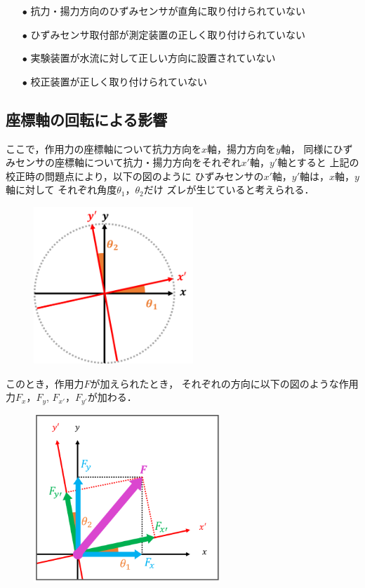 \documentclass[twocolumn,a4j]{jsarticle}
\begin{document}
\begin{itemize}
    \item [$\bullet$] 抗力・揚力方向のひずみセンサが直角に取り付けられていない
    \item [$\bullet$] ひずみセンサ取付部が測定装置の正しく取り付けられていない
    \item [$\bullet$] 実験装置が水流に対して正しい方向に設置されていない
    \item [$\bullet$] 校正装置が正しく取り付けられていない
\end{itemize}

\subsection{座標軸の回転による影響}
ここで，作用力の座標軸について抗力方向を$x軸$，揚力方向を$y$軸，
同様にひずみセンサの座標軸について抗力・揚力方向をそれぞれ$x'$軸，$y'$軸とすると
上記の校正時の問題点により，以下の図のように
ひずみセンサの$x'$軸，$y'$軸は，$x$軸，$y$軸に対して
それぞれ角度$\theta_1$，$\theta_2$だけ
ズレが生じていると考えられる．\\

\begin{figure}[htbp]
    \footnotesize
    \begin{center}
        \includegraphics[width=60mm]{../images/image_1.png}
        \caption{}
    \end{center}
\end{figure}

\newpage

このとき，作用力$F$が加えられたとき，
それぞれの方向に以下の図のような作用力$F_x$，$F_y$, $F_{x'}$，$F_{y'}$が加わる．

\begin{figure}[htbp]
    \footnotesize
    \begin{center}
        \includegraphics[width=70mm]{../images/image_2.png}
        \caption{}
    \end{center}
\end{figure}
\end{document}
